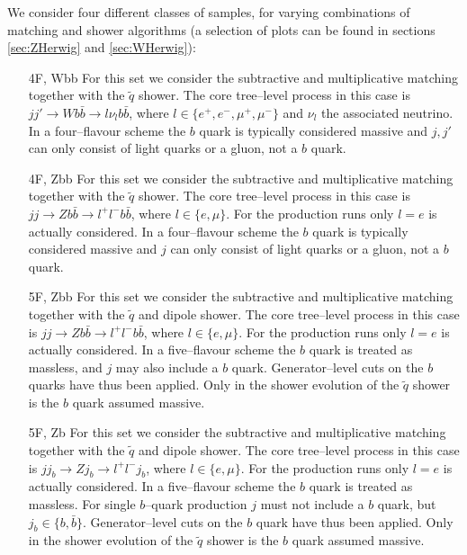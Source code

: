 \documentclass[11pt]{cernrep} \usepackage{graphicx,epsfig} 
\begin{document}
We consider four different classes of samples, for varying combinations of matching and shower algorithms
(a selection of plots can be found in sections \ref{sec:ZHerwig} and \ref{sec:WHerwig}):
\begin{itemize}
\item[4F, Wbb] For this set we consider the subtractive and multiplicative matching
together with the $\tilde{q}$ shower.
The core tree--level process in this case is $jj' \to W b\bar{b} \to l \nu_l b\bar{b}$,
where $l \in \{e^+, e^-, \mu^+, \mu^-\}$ and $\nu_l$ the associated neutrino.
In a four--flavour scheme the $b$ quark is typically considered massive
and $j,j'$ can only consist of light quarks or a gluon, not a $b$ quark.
\item[4F, Zbb] For this set we consider the subtractive and multiplicative matching
together with the $\tilde{q}$ shower.
The core tree--level process in this case is $jj \to Z b\bar{b} \to l^+ l^- b\bar{b}$,
where $l \in \{e, \mu\}$. For the production runs only $l=e$ is actually considered.
In a four--flavour scheme the $b$ quark is typically considered massive
and $j$ can only consist of light quarks or a gluon, not a $b$ quark.
\item[5F, Zbb] For this set we consider the subtractive and multiplicative matching
together with the $\tilde{q}$ and dipole shower.
The core tree--level process in this case is $jj \to Z b\bar{b} \to l^+ l^- b\bar{b}$,
where $l \in \{e, \mu\}$. For the production runs only $l=e$ is actually considered.
In a five--flavour scheme the $b$ quark is treated as massless,
and $j$ may also include a $b$ quark.
Generator--level cuts on the $b$ quarks have thus been applied.
Only in the shower evolution of the $\tilde{q}$ shower is the $b$ quark assumed massive.
\item[5F, Zb] For this set we consider the subtractive and multiplicative matching
together with the $\tilde{q}$ and dipole shower.
The core tree--level process in this case is $jj_b \to Z j_b \to l^+ l^- j_b$,
where $l \in \{e, \mu\}$. For the production runs only $l=e$ is actually considered.
In a five--flavour scheme the $b$ quark is treated as massless.
For single $b$--quark production $j$ must not include a $b$ quark, but $j_b \in \{b,\bar{b}\}$.
Generator--level cuts on the $b$ quark have thus been applied.
Only in the shower evolution of the $\tilde{q}$ shower is the $b$ quark assumed massive.
\end{itemize}
\end{document}
